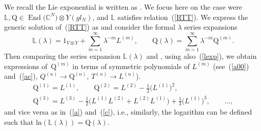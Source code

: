 \documentclass[10pt,a4paper]{amsart}
\numberwithin{equation}{section}
\newcommand{\lb}{\left(}
\newcommand{\rb}{\right)}
\theoremstyle{definition}
\DeclareMathOperator{\EEnd}{End}%
\renewcommand{\ln}[1]{\text{ln} \lb #1 \rb}
\def\mathfrak#1{#1}%
\def\mathcal#1{#1}%
\begin{document}
We recall the Lie exponential is written as .
We focus here on the case were ${\mathbb L}, {\mathrm Q} \in \EEnd\bigl({\mathbb C}^{\mathcal N}\bigr)
\otimes {\mathcal Y}(\mathfrak{gl}_{\mathcal N})$, and ${\mathbb L}$ satisfies relation~(\ref{RTT}).
We express the generic solution of~(\ref{RTT}) as 
and consider the formal $\lambda$ series expansions
\begin{equation}
{\mathbb L}(\lambda) = 1_{V \otimes {\mathcal Y}}+ \sum_{m=1}^{\infty}\lambda^{-m} L^{(m)},
\qquad {\mathrm Q}(\lambda) = \sum_{m=1}^{\infty}\lambda^{-m} {\mathrm Q}^{(m)}. \label{lexp}
\end{equation}
Then comparing the series expansion ${\mathbb L}(\lambda)$ and , using also~(\ref{lexp}),
we obtain expressions of~${\mathrm Q}^{(m)}$ in terms of symmetric polynomials of $L^{(m)}$ \big(see~(\ref{a00}) and~(\ref{ac}), ${{\mathcal Q}^{(n)}\! \to\! {\mathrm Q}^{(n)}}$, ${T^{(n)}\! \to\! L^{(n)} }$\big).
\begin{gather}
{\mathrm Q}^{(1)} = L^{(1)}, \qquad {\mathrm Q}^{(2)} = L^{(2)} -\frac{1}{2} \bigl(L^{(1)}\bigr)^2, \label{a0} \\
{\mathrm Q}^{(3)} = L^{(3)} - \frac{1}{2} \bigl( L^{(1)} L^{(2)} + L^{(2)} L^{(1)}\bigr) +\frac{1}{3} \bigl(L^{(1)}\bigr)^3, \qquad\dots, \label{acd}
\end{gather}
and vice versa as in~(\ref{a}) and~(\ref{c}), i.e., similarly, the logarithm can be defined such that $\ln{{\mathbb L}(\lambda)}= {\mathrm Q}(\lambda)$.
\end{document}

